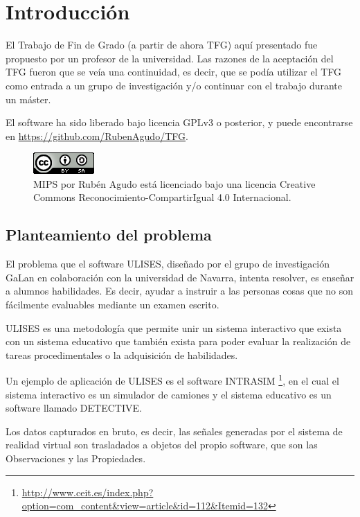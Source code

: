 \chapter{Introducci\'{o}n} 
El Trabajo de Fin de Grado (a partir de ahora TFG) aqu\'{i} presentado fue propuesto por un profesor de la universidad.
Las razones de la aceptaci\'{o}n del TFG fueron que se ve\'{i}a una continuidad, es decir, que se pod\'{i}a 
utilizar el TFG como entrada a un grupo de investigaci\'{o}n y/o continuar con el trabajo durante un m\'{a}ster.

El software ha sido liberado bajo licencia GPLv3 o posterior, y puede encontrarse en 
\url{https://github.com/RubenAgudo/TFG}.

\begin{figure}[h]
    \centering
    \includegraphics{./Figures/cc-by-sa}
    \caption[Licencia]{MIPS por Rubén Agudo est\'a licenciado bajo una licencia Creative Commons Reconocimiento-CompartirIgual 4.0 Internacional.}
    \label{fig:cc-by-sa}
\end{figure}

\section{Planteamiento del problema}
El problema que el software ULISES, dise\~nado por el grupo de investigaci\'on GaLan en colaboraci\'on
con la universidad de Navarra, intenta resolver, es ense\~nar a alumnos habilidades. Es decir, ayudar a 
instruir a las personas cosas que no son f\'acilmente evaluables mediante un examen escrito.

ULISES es una metodolog\'ia que permite unir un sistema interactivo que exista
con un sistema educativo que tambi\'en exista para poder evaluar la realizaci\'on de tareas procedimentales 
o la adquisici\'on de habilidades.

Un ejemplo de aplicaci\'on de ULISES es el software INTRASIM 
\footnote{\url{http://www.ceit.es/index.php?option=com_content&view=article&id=112&Itemid=132}}, 
en el cual el sistema interactivo es un simulador de camiones y el sistema educativo es un software
llamado DETECTIVE.

Los datos capturados en bruto, es decir, las se\~nales generadas por el sistema de 
realidad virtual son trasladados a objetos del propio software,
que son las Observaciones y las Propiedades.

